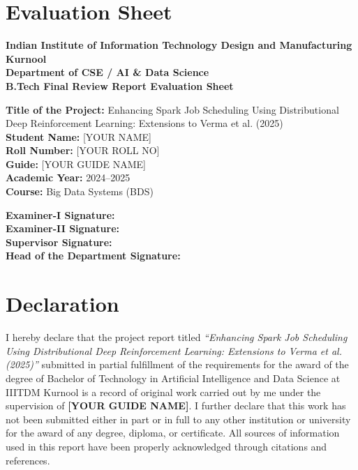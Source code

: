 \documentclass[12pt]{Thesis}
\begin{document}
\frontmatter
\maketitle

\chapter*{Evaluation Sheet}
\begin{center}
\textbf{Indian Institute of Information Technology Design and Manufacturing Kurnool}\\
\textbf{Department of CSE / AI \& Data Science}\\[1em]
\textbf{B.Tech Final Review Report Evaluation Sheet}
\end{center}

\noindent\textbf{Title of the Project:} Enhancing Spark Job Scheduling Using Distributional Deep Reinforcement Learning: Extensions to Verma et al. (2025)\\
\textbf{Student Name:} [YOUR NAME]\\
\textbf{Roll Number:} [YOUR ROLL NO]\\
\textbf{Guide:} [YOUR GUIDE NAME]\\
\textbf{Academic Year:} 2024--2025\\
\textbf{Course:} Big Data Systems (BDS)

\vspace{2em}
\noindent\textbf{Examiner-I Signature:} \hrulefill\\[2em]
\textbf{Examiner-II Signature:} \hrulefill\\[2em]
\textbf{Supervisor Signature:} \hrulefill\\[2em]
\textbf{Head of the Department Signature:} \hrulefill

\chapter*{Declaration}
I hereby declare that the project report titled \emph{``Enhancing Spark Job Scheduling Using Distributional Deep Reinforcement Learning: Extensions to Verma et al. (2025)''} submitted in partial fulfillment of the requirements for the award of the degree of Bachelor of Technology in Artificial Intelligence and Data Science at IIITDM Kurnool is a record of original work carried out by me under the supervision of \textbf{[YOUR GUIDE NAME]}. I further declare that this work has not been submitted either in part or in full to any other institution or university for the award of any degree, diploma, or certificate. All sources of information used in this report have been properly acknowledged through citations and references.
\end{document}
